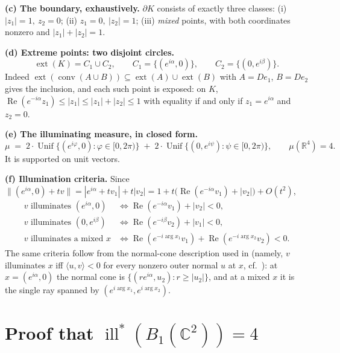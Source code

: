 \documentclass[11pt]{amsart}
\theoremstyle{remark}
\DeclareMathOperator{\ill}{ill}
\DeclareMathOperator{\ext}{ext}
\DeclareMathOperator{\conv}{conv}
\newcommand{\CC}{\mathbb{C}}
\newcommand{\RR}{\mathbb{R}}
\newcommand{\illstar}{\ill^{*}}
\begin{document}
\smallskip
\noindent\textbf{(c) The boundary, exhaustively.} $\partial K$ consists of
exactly three classes: (i) $|z_{1}|=1,\ z_{2}=0$; (ii) $z_{1}=0,\ |z_{2}|=1$;
(iii) \emph{mixed} points, with both coordinates nonzero and
$|z_{1}|+|z_{2}|=1$.

\smallskip
\noindent\textbf{(d) Extreme points: two disjoint circles.}
\[
  \ext(K)=C_{1}\cup C_{2},\qquad
  C_{1}=\{(e^{i\alpha},0)\},\qquad C_{2}=\{(0,e^{i\beta})\}.
\]
Indeed $\ext(\conv(A\cup B))\subseteq\ext(A)\cup\ext(B)$ with $A=De_{1}$,
$B=De_{2}$ gives the inclusion, and each such point is exposed: on $K$,
$\operatorname{Re}(e^{-i\alpha}z_{1})\le|z_{1}|\le|z_{1}|+|z_{2}|\le1$ with
equality if and only if $z_{1}=e^{i\alpha}$ and $z_{2}=0$.

\smallskip
\noindent\textbf{(e) The illuminating measure, in closed form.}
\begin{equation}\label{eq:mu}
  \mu \;=\; 2\cdot\operatorname{Unif}\{(e^{i\varphi},0):\varphi\in[0,2\pi)\}
        \;+\; 2\cdot\operatorname{Unif}\{(0,e^{i\psi}):\psi\in[0,2\pi)\},
  \qquad \mu(\RR^{4})=4 .
\end{equation}
It is supported on unit vectors.

\smallskip
\noindent\textbf{(f) Illumination criteria.} Since
$\|(e^{i\alpha},0)+tv\|=|e^{i\alpha}+tv_{1}|+t|v_{2}|
 =1+t\bigl(\operatorname{Re}(e^{-i\alpha}v_{1})+|v_{2}|\bigr)+O(t^{2})$,
\begin{equation}\label{eq:crit}
\begin{aligned}
  v\text{ illuminates }(e^{i\alpha},0)
    &\iff \operatorname{Re}(e^{-i\alpha}v_{1})+|v_{2}|<0,\\
  v\text{ illuminates }(0,e^{i\beta})
    &\iff \operatorname{Re}(e^{-i\beta}v_{2})+|v_{1}|<0,\\
  v\text{ illuminates a mixed }x
    &\iff \operatorname{Re}(e^{-i\arg x_{1}}v_{1})
          +\operatorname{Re}(e^{-i\arg x_{2}}v_{2})<0 .
\end{aligned}
\end{equation}
The same criteria follow from the normal-cone description used in \cite{RSS}
(namely, $v$ illuminates $x$ iff $\langle u,v\rangle<0$ for every nonzero outer
normal $u$ at $x$, cf.\ \cite[(2.2)]{Schneider}): at $x=(e^{i\alpha},0)$ the
normal cone is $\{(re^{i\alpha},u_{2}):r\ge|u_{2}|\}$, and at a mixed $x$ it is
the single ray spanned by $(e^{i\arg x_{1}},e^{i\arg x_{2}})$.

\section{Proof that \texorpdfstring{$\illstar(B_{1}(\CC^{2}))=4$}{ill*=4}}
\label{sec:value}
\end{document}
